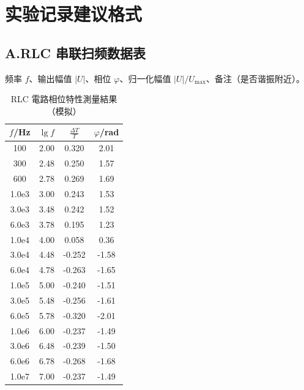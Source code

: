\documentclass[a4paper,8pt,twocolumn]{article}
\begin{document}
\section{实验记录建议格式}
\subsection*{A.\;RLC 串联扫频数据表}
频率 $f$、输出幅值 $|U|$、相位 $\varphi$、归一化幅值 $|U|/U_{\max}$、备注（是否谐振附近）。
\begin{table}[h]
\centering
\caption{RLC 電路相位特性測量結果（模拟）}
\begin{tabular}{cccc}
\hline
$f$/Hz & $\lg f$ & $\frac{\Delta T}{T}$ & $\varphi$/rad \\ \hline
100     & 2.00 & 0.320 & 2.01 \\
300     & 2.48 & 0.250 & 1.57 \\
600     & 2.78 & 0.269 & 1.69 \\
1.0e3   & 3.00 & 0.243 & 1.53 \\
3.0e3   & 3.48 & 0.242 & 1.52 \\
6.0e3   & 3.78 & 0.195 & 1.23 \\
1.0e4   & 4.00 & 0.058 & 0.36 \\
3.0e4   & 4.48 & -0.252 & -1.58 \\
6.0e4   & 4.78 & -0.263 & -1.65 \\
1.0e5   & 5.00 & -0.240 & -1.51 \\
3.0e5   & 5.48 & -0.256 & -1.61 \\
6.0e5   & 5.78 & -0.320 & -2.01 \\
1.0e6   & 6.00 & -0.237 & -1.49 \\
3.0e6   & 6.48 & -0.239 & -1.50 \\
6.0e6   & 6.78 & -0.268 & -1.68 \\
1.0e7   & 7.00 & -0.237 & -1.49 \\ \hline
\end{tabular}
\end{table}
\end{document}
